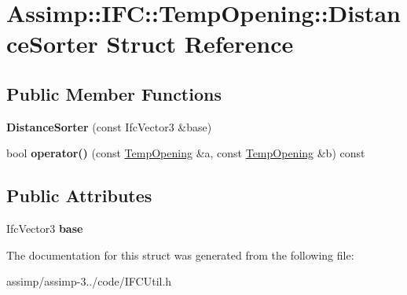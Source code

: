 \hypertarget{struct_assimp_1_1_i_f_c_1_1_temp_opening_1_1_distance_sorter}{\section{Assimp\+:\+:I\+F\+C\+:\+:Temp\+Opening\+:\+:Distance\+Sorter Struct Reference}
\label{struct_assimp_1_1_i_f_c_1_1_temp_opening_1_1_distance_sorter}
}
\subsection*{Public Member Functions}
\begin{DoxyCompactItemize}
\item 
\hypertarget{struct_assimp_1_1_i_f_c_1_1_temp_opening_1_1_distance_sorter_a9a5da586b68abf1594a26bc135088774}{{\bfseries Distance\+Sorter} (const Ifc\+Vector3 \&base)}\label{struct_assimp_1_1_i_f_c_1_1_temp_opening_1_1_distance_sorter_a9a5da586b68abf1594a26bc135088774}

\item 
\hypertarget{struct_assimp_1_1_i_f_c_1_1_temp_opening_1_1_distance_sorter_a584c1291903e33aa5ffa10ce3833c79a}{bool {\bfseries operator()} (const \hyperlink{struct_assimp_1_1_i_f_c_1_1_temp_opening}{Temp\+Opening} \&a, const \hyperlink{struct_assimp_1_1_i_f_c_1_1_temp_opening}{Temp\+Opening} \&b) const }\label{struct_assimp_1_1_i_f_c_1_1_temp_opening_1_1_distance_sorter_a584c1291903e33aa5ffa10ce3833c79a}

\end{DoxyCompactItemize}
\subsection*{Public Attributes}
\begin{DoxyCompactItemize}
\item 
\hypertarget{struct_assimp_1_1_i_f_c_1_1_temp_opening_1_1_distance_sorter_a4a826f9dfa61b70c94441f5cb3dd36c1}{Ifc\+Vector3 {\bfseries base}}\label{struct_assimp_1_1_i_f_c_1_1_temp_opening_1_1_distance_sorter_a4a826f9dfa61b70c94441f5cb3dd36c1}

\end{DoxyCompactItemize}


The documentation for this struct was generated from the following file\+:\begin{DoxyCompactItemize}
\item 
assimp/assimp-\/3../code/I\+F\+C\+Util.\+h\end{DoxyCompactItemize}
